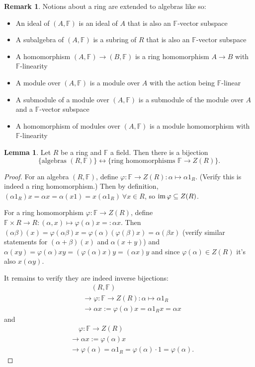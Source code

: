\documentclass[a4paper]{article}
\newcommand{\F}{\mathbb{F}}
\newcommand{\im}{\text{im\,}}
\theoremstyle{definition}
\newtheorem{lemma}[defn]{Lemma}
\newtheorem*{remark}{Remark}
\begin{document}
\begin{remark}
Notions about a ring are extended to algebras like so:
\begin{itemize}
\item An ideal of $(A,\F)$ is an ideal of $A$ that is also an $\F$-vector subspace
\item A subalgebra of $(A,\F)$ is a subring of $R$ that is also an $\F$-vector subspace
\item A homomorphism $(A,\F)\rightarrow (B,\F)$ is a ring homomorphism $A\rightarrow B$ with $\F$-linearity
\item A module over $(A,\F)$ is a module over $A$ with the action being $\F$-linear
\item A submodule of a module over $(A,\F)$ is a submodule of the module over $A$ and a $\F$-vector subspace
\item A homomorphism of modules over $(A,\F)$ is a module homomorphism with $\F$-linearity
\end{itemize}
\end{remark}

\begin{lemma}
Let $R$ be a ring and $\F$ a field. Then there is a bijection
\[
\{\text{algebras }(R,\F)\} \leftrightarrow \{\text{ring homomorphisms }\F\rightarrow Z(R)\}.
\]
\end{lemma}
\begin{proof}
For an algebra $(R,\F)$, define $\varphi:\F\rightarrow Z(R):\alpha\mapsto\alpha1_R$. (Verify this is indeed a ring homomorphism.) Then by definition, $(\alpha 1_R)x=\alpha x=\alpha (x1)=x(\alpha 1_R) \ \forall x\in R$, so $\im\varphi\subseteq Z(R)$.

For a ring homomorphism $\varphi:\F\rightarrow Z(R)$, define $\F\times R\rightarrow R:(\alpha,x)\mapsto \varphi(\alpha)x=:\alpha x$. Then $(\alpha\beta)(x)=\varphi(\alpha\beta)x=\varphi(\alpha)(\varphi(\beta)x)=\alpha(\beta x)$ (verify similar statements for $(\alpha+\beta)(x)$ and $\alpha(x+y)$) and $\alpha(xy)=\varphi(\alpha)xy=(\varphi(\alpha)x)y=(\alpha x)y$ and since $\varphi(\alpha)\in Z(R)$ it's also $x(\alpha y)$.

It remains to verify they are indeed inverse bijections:
\[
\begin{aligned}
&\quad \ (R,\F)\\
&\rightarrow\varphi:\F\rightarrow Z(R):\alpha\mapsto\alpha 1_R\\
&\rightarrow \alpha x:=\varphi(\alpha)x=\alpha 1_R x=\alpha x
\end{aligned}
\]
and
\[
\begin{aligned}
&\quad \ \varphi:\F\rightarrow Z(R)\\
&\rightarrow \alpha x:=\varphi(\alpha)x\\
&\rightarrow \varphi(\alpha)=\alpha 1_R=\varphi(\alpha)\cdot 1=\varphi(\alpha).
\end{aligned}
\]
\end{proof}
\end{document}
